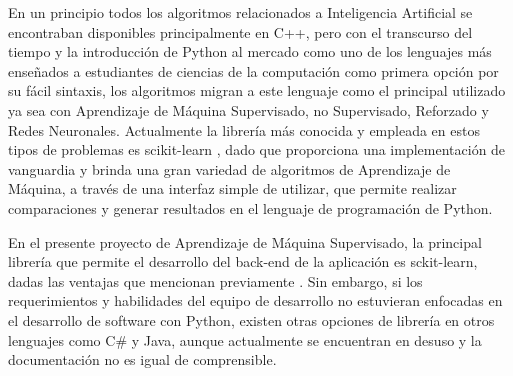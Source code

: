 En un principio todos los algoritmos relacionados a Inteligencia Artificial se encontraban disponibles principalmente en C++, pero con el transcurso del tiempo y la introducción de Python al mercado como uno de los lenguajes más enseñados a estudiantes de ciencias de la computación como primera opción por su fácil sintaxis, los algoritmos migran a este lenguaje como el principal utilizado ya sea con Aprendizaje de Máquina Supervisado, no Supervisado, Reforzado y Redes Neuronales. Actualmente la librería más conocida y empleada en estos tipos de problemas es scikit-learn \parencite{scikit-learn}, dado que proporciona una implementación de vanguardia y brinda una gran variedad de algoritmos de Aprendizaje de Máquina, a través de una interfaz simple de utilizar, que permite realizar comparaciones y generar resultados en el lenguaje de programación de Python.

En el presente proyecto de Aprendizaje de Máquina Supervisado, la principal librería que permite el desarrollo del back-end de la aplicación es sckit-learn, dadas las ventajas que mencionan previamente \textcite{scikit-learn}. Sin embargo, si los requerimientos y habilidades del equipo de desarrollo no estuvieran enfocadas en el desarrollo de software con Python, existen otras opciones de librería en otros lenguajes como C\# y Java, aunque actualmente se encuentran en desuso y la documentación no es igual de comprensible.